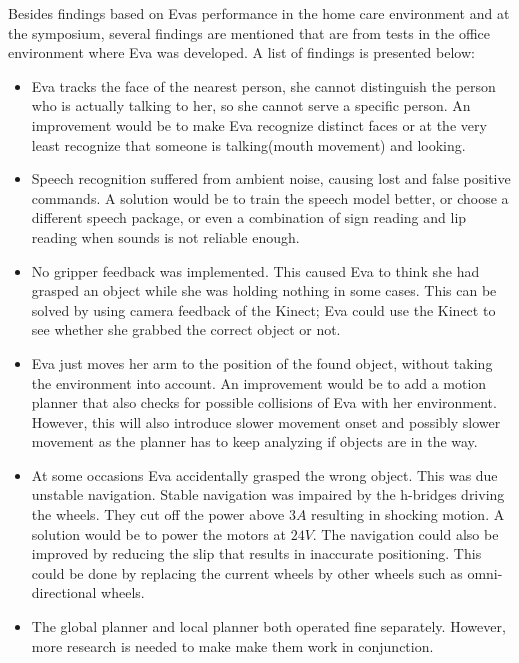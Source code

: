 \documentclass[project_eva.tex]{subfiles}
\begin{document}
Besides findings based on Eva\textquotesingle s performance in the home care environment and at the symposium, several findings are mentioned that are from tests in the office environment where Eva was developed. A list of findings is presented below:

\begin{itemize}
\item Eva tracks the face of the nearest person, she cannot distinguish the person who is actually talking to her, so she cannot serve a specific person. An improvement would be to make Eva recognize distinct faces or at the very least recognize that someone is talking(mouth movement) and looking.

\item Speech recognition suffered from ambient noise, causing lost and false positive commands. A solution would be to train the speech model better, or choose a different speech package, or even a combination of sign reading and lip reading when sounds is not reliable enough.

\item No gripper feedback was implemented. This caused Eva to think she had grasped an object while she was holding nothing in some cases. This can be solved by using camera feedback of the Kinect; Eva could use the Kinect to see whether she grabbed the correct object or not.

\item Eva just moves her arm to the position of the found object, without taking the environment into account. An improvement would be to add a motion planner that also checks for possible collisions of Eva with her environment. However, this will also introduce slower movement onset and possibly slower movement as the planner has to keep analyzing if objects are in the way.

\item  At some occasions Eva accidentally grasped the wrong object. This was due unstable navigation. Stable navigation was impaired by the h-bridges driving the wheels. They cut off the power above $3A$ resulting in shocking motion. A solution would be to power the motors at $24V$. The navigation could also be improved by reducing the slip  that results in inaccurate positioning. This could be done by replacing the current wheels by other wheels such as omni-directional wheels.

\item The global planner and local planner both operated fine separately. However, more research is needed to make make them work in conjunction.


\end{itemize}
\end{document}
